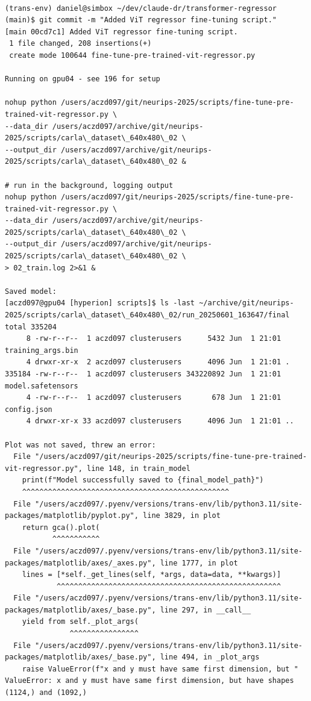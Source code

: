 \begin{verbatim}

(trans-env) daniel@simbox ~/dev/claude-dr/transformer-regressor (main)$ git commit -m "Added ViT regressor fine-tuning script."
[main 00cd7c1] Added ViT regressor fine-tuning script.
 1 file changed, 208 insertions(+)
 create mode 100644 fine-tune-pre-trained-vit-regressor.py
 
Running on gpu04 - see 196 for setup

nohup python /users/aczd097/git/neurips-2025/scripts/fine-tune-pre-trained-vit-regressor.py \
--data_dir /users/aczd097/archive/git/neurips-2025/scripts/carla\_dataset\_640x480\_02 \
--output_dir /users/aczd097/archive/git/neurips-2025/scripts/carla\_dataset\_640x480\_02 &

# run in the background, logging output
nohup python /users/aczd097/git/neurips-2025/scripts/fine-tune-pre-trained-vit-regressor.py \
--data_dir /users/aczd097/archive/git/neurips-2025/scripts/carla\_dataset\_640x480\_02 \
--output_dir /users/aczd097/archive/git/neurips-2025/scripts/carla\_dataset\_640x480\_02 \
> 02_train.log 2>&1 &

Saved model:
[aczd097@gpu04 [hyperion] scripts]$ ls -last ~/archive/git/neurips-2025/scripts/carla\_dataset\_640x480\_02/run_20250601_163647/final
total 335204
     8 -rw-r--r--  1 aczd097 clusterusers      5432 Jun  1 21:01 training_args.bin
     4 drwxr-xr-x  2 aczd097 clusterusers      4096 Jun  1 21:01 .
335184 -rw-r--r--  1 aczd097 clusterusers 343220892 Jun  1 21:01 model.safetensors
     4 -rw-r--r--  1 aczd097 clusterusers       678 Jun  1 21:01 config.json
     4 drwxr-xr-x 33 aczd097 clusterusers      4096 Jun  1 21:01 ..

Plot was not saved, threw an error:
  File "/users/aczd097/git/neurips-2025/scripts/fine-tune-pre-trained-vit-regressor.py", line 148, in train_model
    print(f"Model successfully saved to {final_model_path}")
    ^^^^^^^^^^^^^^^^^^^^^^^^^^^^^^^^^^^^^^^^^^^^^^^^
  File "/users/aczd097/.pyenv/versions/trans-env/lib/python3.11/site-packages/matplotlib/pyplot.py", line 3829, in plot
    return gca().plot(
           ^^^^^^^^^^^
  File "/users/aczd097/.pyenv/versions/trans-env/lib/python3.11/site-packages/matplotlib/axes/_axes.py", line 1777, in plot
    lines = [*self._get_lines(self, *args, data=data, **kwargs)]
            ^^^^^^^^^^^^^^^^^^^^^^^^^^^^^^^^^^^^^^^^^^^^^^^^^^^^
  File "/users/aczd097/.pyenv/versions/trans-env/lib/python3.11/site-packages/matplotlib/axes/_base.py", line 297, in __call__
    yield from self._plot_args(
               ^^^^^^^^^^^^^^^^
  File "/users/aczd097/.pyenv/versions/trans-env/lib/python3.11/site-packages/matplotlib/axes/_base.py", line 494, in _plot_args
    raise ValueError(f"x and y must have same first dimension, but "
ValueError: x and y must have same first dimension, but have shapes (1124,) and (1092,)


\end{verbatim}
